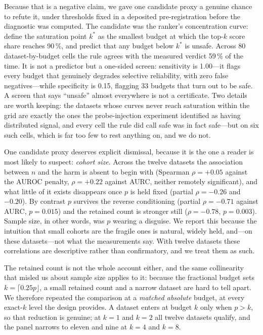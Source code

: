 \documentclass[fleqn,10pt]{wlscirep}
\newcommand{\result}[1]{#1}
\begin{document}
Because that is a negative claim, we gave one candidate proxy a genuine chance to refute it, under
thresholds fixed in a deposited pre-registration before the diagnostic was computed. The candidate was
the ranker's concentration curve: define the saturation point $k^{*}$ as the smallest budget at which
the top-$k$ score share reaches \result{90\,\%}, and predict that any budget below $k^{*}$ is unsafe.
Across \result{80} dataset-by-budget cells the rule agrees with the measured verdict
\result{59\,\%} of the time. It is not a predictor but a one-sided screen: sensitivity is
\result{1.00}---it flags every budget that genuinely degrades selective reliability, with
\result{zero} false negatives---while specificity is \result{0.15}, flagging \result{33} budgets that
turn out to be safe. A screen that says ``unsafe'' almost everywhere is not a certificate. Two details are
worth keeping: the datasets whose curves never reach saturation within the grid are exactly the ones the
probe-injection experiment identified as having distributed signal, and every cell the rule did call
safe was in fact safe---but on \result{six} such cells, which is far too few to rest anything on, and
we do not.

One candidate proxy deserves explicit dismissal, because it is the one a reader is most likely to
suspect: \emph{cohort size}. Across the twelve datasets the association between $n$ and the harm is
absent to begin with (Spearman $\rho=\result{+0.05}$ against the AUROC penalty,
$\rho=\result{+0.22}$ against AURC, neither remotely significant), and what little of it exists
disappears once $p$ is held fixed (partial $\rho=\result{-0.26}$ and \result{$-0.20$}). By contrast
$p$ survives the reverse conditioning (partial $\rho=\result{-0.71}$ against AURC, $p=\result{0.015}$)
and the retained count is stronger still ($\rho=\result{-0.78}$, $p=\result{0.003}$). Sample size,
in other words, was $p$ wearing a disguise. We report this because the intuition that small cohorts
are the fragile ones is natural, widely held, and---on these datasets---not what the measurements
say. With twelve datasets these correlations are descriptive rather than confirmatory, and we treat
them as such.

The retained count is not the whole account either, and the same collinearity that misled us about
sample size applies to it: because the fractional budget sets $k=\lceil 0.25p \rfloor$, a small
retained count and a narrow dataset are hard to tell apart. We therefore repeated the comparison at a
\emph{matched absolute} budget, at every exact-$k$ level the design provides. A dataset enters at
budget $k$ only when $p>k$, so that reduction is genuine; at $k=\result{1}$ and $k=\result{2}$ all
\result{twelve} datasets qualify, and the panel narrows to \result{eleven} and \result{nine} at
$k=\result{4}$ and $k=\result{8}$.
\end{document}

